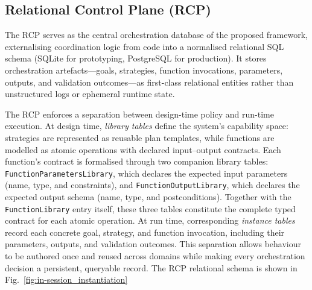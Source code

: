 \documentclass[largeformat]{interact}
\begin{document}
\subsection{Relational Control Plane (RCP)}
\label{subsec:relational_control_plane}
The RCP serves as the central orchestration database of the proposed framework, externalising coordination logic from code into a normalised relational SQL schema (SQLite for prototyping, PostgreSQL for production). It stores orchestration artefacts---goals, strategies, function invocations, parameters, outputs, and validation outcomes---as first-class relational entities rather than unstructured logs or ephemeral runtime state.
 
The RCP enforces a separation between design-time policy and run-time execution. At design time, \emph{library tables} define the system's capability space: strategies are represented as reusable plan templates, while functions are modelled as atomic operations with declared input--output contracts. Each function's contract is formalised through two companion library tables: \texttt{FunctionParametersLibrary}, which declares the expected input parameters (name, type, and constraints), and \texttt{FunctionOutputLibrary}, which declares the expected output schema (name, type, and postconditions). Together with the \texttt{FunctionLibrary} entry itself, these three tables constitute the complete typed contract for each atomic operation. At run time, corresponding \emph{instance tables} record each concrete goal, strategy, and function invocation, including their parameters, outputs, and validation outcomes. This separation allows behaviour to be authored once and reused across domains while making every orchestration decision a persistent, queryable record.
The RCP relational schema is shown in Fig.~\ref{fig:in-session_instantiation}
\end{document}
